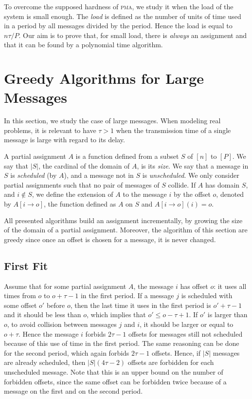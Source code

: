 \documentclass[10pt, conference, letterpaper]{IEEEtran}
\newcommand\pma{\textsc{pma}\xspace}
\begin{document}
To overcome the supposed hardness of \pma, we study it when the load of the system is small enough. The \emph{load} is defined as the number of units of time used in a period by all messages divided by the period. Hence the load is equal to $n\tau /P$. Our aim is to prove that, for small load, there is \emph{always} an assignment and that it can be found by a polynomial time algorithm.



\section{Greedy Algorithms for Large Messages} \label{sec:large}

In this section, we study the case of large messages. When modeling real problems,
it is relevant to have $\tau > 1$ when the transmission time of a single message is large with regard to its delay.

A partial assignment $A$ is a function defined from a subset $S$ of $[n]$ to $[P]$.
We say that $|S|$, the cardinal of the domain of $A$, is its \emph{size}.
We say that a message in $S$ is \emph{scheduled} (by $A$), and a message not in $S$ is \emph{unscheduled}. We only consider partial assignments such that no pair of messages of $S$ collide. If $A$ has domain $S$, and $i \notin S$, we define the extension of $A$ to the message $i$ by the offset $o$, denoted by $A[i \rightarrow o]$, the function defined as $A$ on $S$ and $A[i \rightarrow o](i) = o$.

All presented algorithms build an assignment incrementally, by growing the size of the domain of a partial assignment. Moreover, the algorithm of this section are greedy since once an offset is chosen for a message, it is never changed.


\subsection{First Fit}


Assume that for some partial assignment $A$, the message $i$ has offset $o$: it uses all times from $o$ to $o + \tau -1$ in the first period. If a message $j$ is scheduled with some offset $o'$ before $o$, then the last time it uses in the first period is $o'+\tau-1$ and it should be less than $o$, which implies that $o' \leq o - \tau + 1$. If $o'$ is larger than $o$, to avoid collision between messages $j$ and $i$, it should be larger or equal to $o+ \tau$. Hence the message $i$ forbids $2\tau -1$ offsets for messages still not scheduled because of this use of time in the first period. The same reasoning can be done for the second period, which again forbids $2\tau -1$ offsets. Hence, if $|S|$ messages are already scheduled, then $|S|(4\tau -2)$ offsets are forbidden for each unscheduled message. Note that this is an upper bound on the number of forbidden offsets, since the same offset can be forbidden twice because of a message on the first and on the second period.
\end{document}
